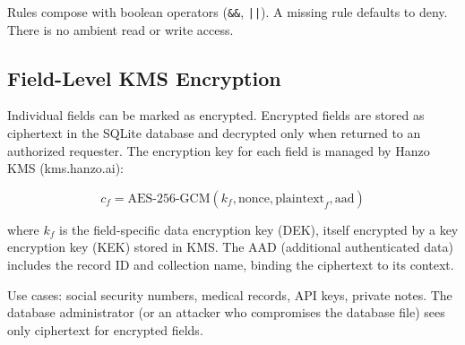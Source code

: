 Rules compose with boolean operators (\texttt{\&\&}, \texttt{||}). A missing
rule defaults to deny. There is no ambient read or write access.

\subsection{Field-Level KMS Encryption}

Individual fields can be marked as encrypted. Encrypted fields are stored as
ciphertext in the SQLite database and decrypted only when returned to an
authorized requester. The encryption key for each field is managed by
Hanzo KMS (kms.hanzo.ai):

\begin{equation}
c_f = \text{AES-256-GCM}(k_f, \text{nonce}, \text{plaintext}_f, \text{aad})
\end{equation}

where $k_f$ is the field-specific data encryption key (DEK), itself encrypted
by a key encryption key (KEK) stored in KMS. The AAD (additional authenticated
data) includes the record ID and collection name, binding the ciphertext to
its context.

Use cases: social security numbers, medical records, API keys, private notes.
The database administrator (or an attacker who compromises the database file)
sees only ciphertext for encrypted fields.

